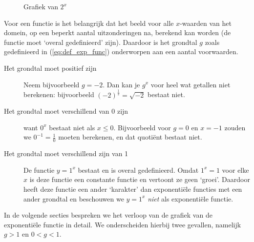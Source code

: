  \begin{figure}[htbp]
      \centering
     \caption{Grafiek van $2^{x}$}
     \label{fig:2x}
 \end{figure}

Voor een functie is het belangrijk dat het beeld voor alle $x$-waarden van het domein, op een beperkt aantal uitzonderingen na, berekend kan worden (de functie moet `overal gedefinieerd' zijn). Daardoor is het grondtal $g$ zoals gedefinieerd in (\ref{eq:def_exp_func}) onderworpen aan een aantal voorwaarden.
\begin{description}
\item[ Het grondtal moet positief zijn]  
Neem bijvoorbeeld $g=-2$. Dan kan je $g^x$ voor heel wat getallen niet berekenen: bijvoorbeeld $(-2)^\frac12=\sqrt{-2}$ bestaat niet.
\item[Het grondtal moet verschillend van $0$ zijn] want $0^{x}$ bestaat
    niet als $x\leq 0$. Bijvoorbeeld  voor $g=0$ en $x=-1$ zouden we $0^{-1}=\frac{1}{0}$ moeten berekenen, en dat quoti\"ent bestaat niet.
\item[Het grondtal moet verschillend zijn van 1] De functie $y=1^x$ bestaat en is overal gedefinieerd. Omdat $1^x=1$ voor elke $x$ is deze functie een constante functie en vertoont ze geen `groei'. Daardoor heeft deze functie een ander `karakter' dan exponenti\"ele functies met een ander grondtal en beschouwen we $y=1^x$ \emph{niet} als exponenti\"ele functie.
\end{description}

In de volgende secties bespreken we het verloop van de grafiek van de exponenti\"ele functie in detail. We onderscheiden hierbij twee gevallen, namelijk $g>1$ en $0<g<1$.


